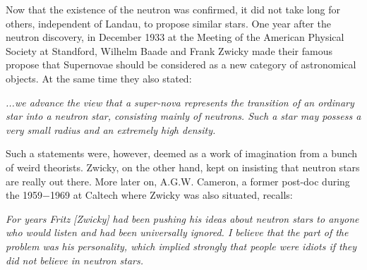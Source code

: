 Now that the existence of the neutron was confirmed, it did not take long for others, independent of Landau, to propose similar stars.
One year after the neutron discovery, in December 1933 at the Meeting of the American Physical Society at Standford, Wilhelm Baade and Frank Zwicky made their famous propose that Supernovae should be considered as a new category of astronomical objects.\cite{Baade34a, Baade34aa}
At the same time they also stated:
\begin{displayquote}
    \textit{...we advance the view that a super-nova represents the transition of an ordinary star into a neutron star, consisting mainly of neutrons. Such a star may possess a very small radius and an extremely high density.}
\end{displayquote}
Such a statements were, however, deemed as a work of imagination from a bunch of weird theorists.
Zwicky, on the other hand, kept on insisting that neutron stars are really out there.
More later on, A.G.W. Cameron, a former post-doc during the 1959$-$1969 at Caltech where Zwicky was also situated, recalls:
\begin{displayquote}[Cameron, 1999]
    \textit{For years Fritz [Zwicky] had been pushing his ideas about neutron stars to anyone who would listen and had been universally ignored. 
    I believe that the part of the problem was his personality, which implied strongly that people were idiots if they did not believe in neutron stars.
    }
\end{displayquote}


%

